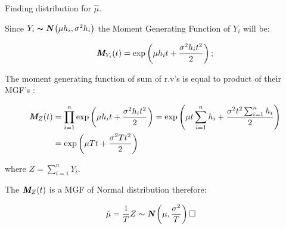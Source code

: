 \begin{solution} Finding distribution for $\hat{\mu}$.

Since $Y_i \thicksim \textbf{\em N}\left(\mu h_i, \sigma^2 h_i\right)$ the Moment Generating Function of $Y_i$ will be:

\begin{equation}
\textbf{\em M}_{Y_i}(t) = \exp\left(\mu h_it + \frac{\sigma^2 h_i t^2}{2}\right);
\end{equation}

The moment generating function of sum of r.v's is equal to product of their MGF's :

\begin{equation}
\begin{aligned}
\textbf{\em M}_{Z}(t) & = \prod_{i=1}^{n}\exp\left(\mu h_it + \frac{\sigma^2 h_i t^2}{2}\right) 
									  = \exp\left(\mu t \sum_{i=1}^{n}h_i + \frac{\sigma^2t^2 \sum_{i=1}^{n}h_i}{2}\right) \\
									& = \exp\left(\mu Tt + \frac{\sigma^2Tt^2}{2}\right)
\end{aligned}
\end{equation}

where $Z=\sum_{i=1}^{n}Y_i$.


The $\textbf{\em M}_{Z}(t)$ is a MGF of Normal distribution therefore:
 
\begin{equation}
\begin{aligned}
\hat{\mu} = \frac{1}{T}Z & \thicksim \textbf{\em N}\left(\mu, \frac{\sigma^2}{T}\right)\square
\end{aligned}
\end{equation}

\end{solution}